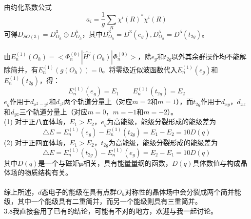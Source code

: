 \documentclass[12pt]{article}
\numberwithin{equation}{section}	 %
\begin{document}
\begin{spacing}{1.5}
~\\
由约化系数公式
\begin{equation}
a_{i} = \frac{1}{g}\sum_{R}\chi^{i}(R)^{*}\chi^{i}(R)
\end{equation}
可得$D_{SO(3)} = D^{3}_{O_{h}} \oplus D^{5}_{O_{h}}$，其中$D^{3}_{O_{h}} = D^{3}(e_{g}), D^{5}_{O_{h}} = D^{5}(t_{2g})$。\\
~\\
由$\displaystyle E_{n}^{(1)}(O_{h}) = <\Phi_{n}^{(0)}|\hat{H'}(O_{h})|\Phi_{n}^{(0)}>$，除$e_{g}$和$t_{2g}$以外其余群操作均不能解除简并，有$E_{n}^{(1)}(g(O_{h})) = 0$。将零级近似波函数代入$E_{n}^{(1)}(e_{g})$和$E_{n}^{(1)}(t_{2g})$，得：\\
\begin{equation}
E_{n}^{(1)}(e_{g}) = E_{1} \qquad E_{n}^{(1)}(t_{2g}) = E_{2}
\end{equation}
$e_{g}$作用于$d_{x^{2}-y^{2}}$和$d_{z^{2}}$两个轨道分量上（对应$m=2$和$m=1$），而$t_{2g}$作用于$d_{xy}$，$d_{xz}$和$d_{yz}$三个轨道分量上（对应$m=0$，$m=-1$和$m=-2$）。\\
(1) 对于正八面体场，$E_{1} > E_{2}$，$e_{g}$为高能级，能级分裂形成的能级差为
\begin{equation}
\triangle E = E_{n}^{(1)}(e_{g}) - E_{n}^{(1)}(t_{2g}) = E_{1} - E_{2} = 10D(q)
\end{equation}
(2) 对于正四面体场，$E_{1} > E_{2}$，$t_{2g}$为高能级，能级分裂形成的能级差为
\begin{equation}
\triangle E = E_{n}^{(1)}(t_{2g}) - E_{n}^{(1)}(e_{g}) = E_{2} - E_{1} = 10D(q)
\end{equation}
其中$D(q)$是一个与磁矩$\bm\mu$相关，具有能量量纲的函数，$D(q)$具体数值与构成晶体场的物质结构有关。\\
~\\
综上所述，$d$态电子的能级在具有点群$O_{h}$对称性的晶体场中会分裂成两个简并能级，其中一个能级具有二重简并，而另一个能级则具有三重简并。\\

{\color{red}3.8我直接套用了已有的结论，可能有不对的地方，欢迎与我一起讨论。}

\end{spacing} 		%
\end{document}

